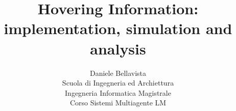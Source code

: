 \documentclass[11pt]{article}
\begin{document}
\title{Hovering Information: implementation, simulation and analysis}
\author{Daniele Bellavista\\
Scuola di Ingegneria ed Archiettura\\
Ingegneria Informatica Magistrale\\
Corso Sistemi Multiagente LM\\
}

\maketitle




%


\nocite{*}
{}
\end{document}
